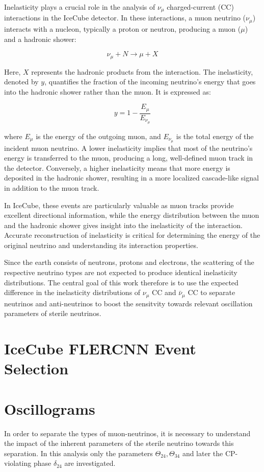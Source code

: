 \documentclass[a4paper,12pt,numbered]{article}
\begin{document}
Inelasticity plays a crucial role in the analysis of \(\nu_\mu\) charged-current (CC) interactions in the IceCube detector. In these interactions, a muon neutrino (\(\nu_\mu\)) interacts with a nucleon, typically a proton or neutron, producing a muon (\(\mu\)) and a hadronic shower:

\[
\nu_\mu + N \rightarrow \mu + X
\]

Here, \(X\) represents the hadronic products from the interaction. The inelasticity, denoted by \(y\), quantifies the fraction of the incoming neutrino's energy that goes into the hadronic shower rather than the muon. It is expressed as:

\[
y = 1 - \frac{E_\mu}{E_{\nu_\mu}}
\]

where \(E_\mu\) is the energy of the outgoing muon, and \(E_{\nu_\mu}\) is the total energy of the incident muon neutrino. A lower inelasticity implies that most of the neutrino's energy is transferred to the muon, producing a long, well-defined muon track in the detector. Conversely, a higher inelasticity means that more energy is deposited in the hadronic shower, resulting in a more localized cascade-like signal in addition to the muon track.

In IceCube, these events are particularly valuable as muon tracks provide excellent directional information, while the energy distribution between the muon and the hadronic shower gives insight into the inelasticity of the interaction. Accurate reconstruction of inelasticity is critical for determining the energy of the original neutrino and understanding its interaction properties.

Since the earth consists of neutrons, protons and electrons, the scattering of the respective neutrino types are not expected to produce identical inelasticity distributions. The central goal of this work therefore is to use the expected difference in the inelasticity distributions of $\nu_\mu$ CC and $\bar{\nu}_\mu$ CC to separate neutrinos and anti-neutrinos to boost the sensitvity towards relevant oscillation parameters of sterile neutrinos.

\section{IceCube FLERCNN Event Selection}
\section{Oscillograms}

In order to separate the types of muon-neutrinos, it is necessary to understand the impact of the inherent parameters of the sterile neutrino towards this separation. In this analysis only the parameters $\Theta_{24},\Theta_{34}$ and later the CP-violating phase $\delta_{24}$ are investigated.
\end{document}
